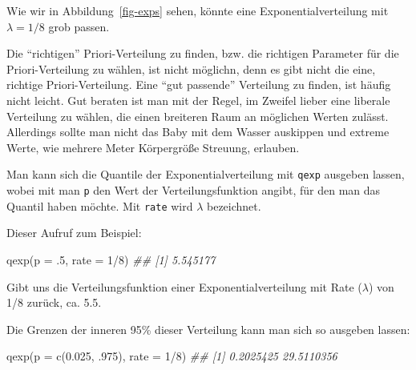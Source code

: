 \documentclass[
  a4paper,
  DIV=11]{scrreprt}
\newenvironment{Shaded}{\begin{snugshade}}{\end{snugshade}}
\newcommand{\AttributeTok}[1]{\textcolor[rgb]{0.40,0.45,0.13}{#1}}
\newcommand{\DecValTok}[1]{\textcolor[rgb]{0.68,0.00,0.00}{#1}}
\newcommand{\DocumentationTok}[1]{\textcolor[rgb]{0.37,0.37,0.37}{\textit{#1}}}
\newcommand{\FloatTok}[1]{\textcolor[rgb]{0.68,0.00,0.00}{#1}}
\newcommand{\FunctionTok}[1]{\textcolor[rgb]{0.28,0.35,0.67}{#1}}
\newcommand{\NormalTok}[1]{\textcolor[rgb]{0.00,0.23,0.31}{#1}}
\newcommand{\SpecialCharTok}[1]{\textcolor[rgb]{0.37,0.37,0.37}{#1}}
\theoremstyle{definition}
\theoremstyle{remark}
\begin{document}
Wie wir in Abbildung~\ref{fig-exps} sehen, könnte eine
Exponentialverteilung mit \(\lambda=1/8\) grob passen.

\begin{tcolorbox}[enhanced jigsaw, leftrule=.75mm, left=2mm, bottomrule=.15mm, opacityback=0, coltitle=black, colbacktitle=quarto-callout-note-color!10!white, opacitybacktitle=0.6, rightrule=.15mm, toptitle=1mm, colback=white, colframe=quarto-callout-note-color-frame, arc=.35mm, toprule=.15mm, breakable, titlerule=0mm, bottomtitle=1mm, title=\textcolor{quarto-callout-note-color}{\faInfo}\hspace{0.5em}{Hinweis}]
Die ``richtigen'' Priori-Verteilung zu finden, bzw. die richtigen
Parameter für die Priori-Verteilung zu wählen, ist nicht möglichn, denn
es gibt nicht die eine, richtige Priori-Verteilung. Eine ``gut
passende'' Verteilung zu finden, ist häufig nicht leicht. Gut beraten
ist man mit der Regel, im Zweifel lieber eine liberale Verteilung zu
wählen, die einen breiteren Raum an möglichen Werten zulässt. Allerdings
sollte man nicht das Baby mit dem Wasser auskippen und extreme Werte,
wie mehrere Meter Körpergröße Streuung, erlauben.
\end{tcolorbox}

Man kann sich die Quantile der Exponentialverteilung mit \texttt{qexp}
ausgeben lassen, wobei mit man \texttt{p} den Wert der
Verteilungsfunktion angibt, für den man das Quantil haben möchte. Mit
\texttt{rate} wird \(\lambda\) bezeichnet.

Dieser Aufruf zum Beispiel:

\begin{Shaded}
\begin{Highlighting}[]
\FunctionTok{qexp}\NormalTok{(}\AttributeTok{p =}\NormalTok{ .}\DecValTok{5}\NormalTok{, }\AttributeTok{rate =} \DecValTok{1}\SpecialCharTok{/}\DecValTok{8}\NormalTok{)}
\DocumentationTok{\#\# [1] 5.545177}
\end{Highlighting}
\end{Shaded}

Gibt uns die Verteilungsfunktion einer Exponentialverteilung mit Rate
(\(\lambda\)) von 1/8 zurück, ca. 5.5.

Die Grenzen der inneren 95\% dieser Verteilung kann man sich so ausgeben
lassen:

\begin{Shaded}
\begin{Highlighting}[]
\FunctionTok{qexp}\NormalTok{(}\AttributeTok{p =} \FunctionTok{c}\NormalTok{(}\FloatTok{0.025}\NormalTok{, .}\DecValTok{975}\NormalTok{), }\AttributeTok{rate =} \DecValTok{1}\SpecialCharTok{/}\DecValTok{8}\NormalTok{)}
\DocumentationTok{\#\# [1]  0.2025425 29.5110356}
\end{Highlighting}
\end{Shaded}
\end{document}
